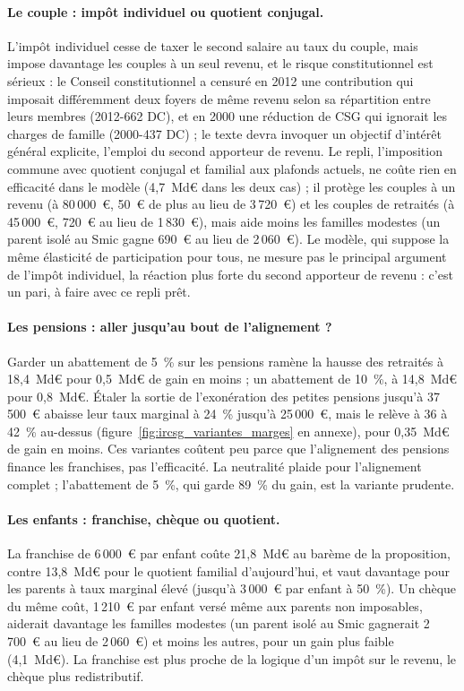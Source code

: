 

\paragraph{Le couple : impôt individuel ou quotient conjugal.} L'impôt individuel cesse de taxer le second salaire au
taux du couple, mais impose davantage les couples à un seul revenu, et le risque constitutionnel est sérieux : le
Conseil constitutionnel a censuré en 2012 une contribution qui imposait différemment deux foyers de même revenu selon sa
répartition entre leurs membres (2012-662 DC), et en 2000 une réduction de CSG qui ignorait les charges de famille
(2000-437 DC) ; le texte devra invoquer un objectif d'intérêt général explicite, l'emploi du second apporteur de revenu.
Le repli, l'imposition commune avec quotient conjugal et familial aux plafonds actuels, ne coûte rien en efficacité dans
le modèle (4,7~Md€ dans les deux cas) ; il protège les couples à un revenu (à 80\,000~€, 50~€ de plus au lieu de
3\,720~€) et les couples de retraités (à 45\,000~€, 720~€ au lieu de 1\,830~€), mais aide moins les familles modestes
(un parent isolé au Smic gagne 690~€ au lieu de 2\,060~€). Le modèle, qui suppose la même élasticité de participation
pour tous, ne mesure pas le principal argument de l'impôt individuel, la réaction plus forte du second apporteur de
revenu : c'est un pari, à faire avec ce repli prêt.

\paragraph{Les pensions : aller jusqu'au bout de l'alignement ?} Garder un abattement de 5~\% sur les pensions ramène la
hausse des retraités à 18,4~Md€ pour 0,5~Md€ de gain en moins ; un abattement de 10~\%, à 14,8~Md€ pour 0,8~Md€. Étaler
la sortie de l'exonération des petites pensions jusqu'à 37\,500~€ abaisse leur taux marginal à 24~\% jusqu'à 25\,000~€,
mais le relève à 36 à 42~\% au-dessus (figure~\ref{fig:ircsg_variantes_marges} en annexe), pour 0,35~Md€ de gain en
moins. Ces variantes coûtent peu parce que l'alignement des pensions finance les franchises, pas l'efficacité. La
neutralité plaide pour l'alignement complet ; l'abattement de 5~\%, qui garde 89~\% du gain, est la variante prudente.

\paragraph{Les enfants : franchise, chèque ou quotient.} La franchise de 6\,000~€ par enfant coûte 21,8~Md€ au barème de
la proposition, contre 13,8~Md€ pour le quotient familial d'aujourd'hui, et vaut davantage pour les parents à taux
marginal élevé (jusqu'à 3\,000~€ par enfant à 50~\%). Un chèque du même coût, 1\,210~€ par enfant versé même aux parents
non imposables, aiderait davantage les familles modestes (un parent isolé au Smic gagnerait 2\,700~€ au lieu de
2\,060~€) et moins les autres, pour un gain plus faible (4,1~Md€). La franchise est plus proche de la logique d'un impôt
sur le revenu, le chèque plus redistributif.

